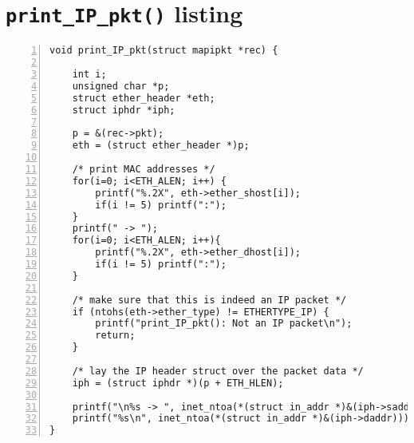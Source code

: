 \documentclass[a4paper, 11pt]{article}
\begin{document}
\section{{\tt print\_IP\_pkt()} listing}
\label{sec:misccode}

\begin{Verbatim}[numbersep=12pt, numbers=left, baselinestretch=1.0, fontsize=\small]
void print_IP_pkt(struct mapipkt *rec) {
    
    int i;
    unsigned char *p;
    struct ether_header *eth;
    struct iphdr *iph;
    
    p = &(rec->pkt);
    eth = (struct ether_header *)p;

    /* print MAC addresses */
    for(i=0; i<ETH_ALEN; i++) {
        printf("%.2X", eth->ether_shost[i]);
        if(i != 5) printf(":");
    }       
    printf(" -> ");
    for(i=0; i<ETH_ALEN; i++){ 
        printf("%.2X", eth->ether_dhost[i]); 
        if(i != 5) printf(":");
    }
    
    /* make sure that this is indeed an IP packet */
    if (ntohs(eth->ether_type) != ETHERTYPE_IP) {
        printf("print_IP_pkt(): Not an IP packet\n");
        return;
    }

    /* lay the IP header struct over the packet data */
    iph = (struct iphdr *)(p + ETH_HLEN);
    
    printf("\n%s -> ", inet_ntoa(*(struct in_addr *)&(iph->saddr)));
    printf("%s\n", inet_ntoa(*(struct in_addr *)&(iph->daddr)));
}
\end{Verbatim}
\end{document}
